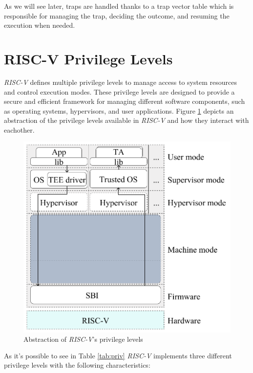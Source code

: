 As we will see later, traps are handled thanks to a trap vector table which is responsible
for managing the trap, deciding the outcome, and resuming the execution when needed.

\section{RISC-V Privilege Levels}
\label{sec:riscv_privileges}

\textit{RISC-V} defines multiple privilege levels to manage access to system resources
and control execution modes. These privilege levels are designed to provide a
secure and efficient framework for managing different software components, such as
operating systems, hypervisors, and user applications. Figure \ref{fig:priv}
depicts an abstraction of the privilege levels available in \textit{RISC-V} and how
they interact with eachother.

\begin{figure}[htbp]
  \centering
  \includegraphics[width=.5\linewidth]{images/privileges.png}
  \caption{Abstraction of \textit{RISC-V}'s privilege levels}
  \label{fig:priv}
\end{figure}

As it's possible to see in Table \ref{tab:priv} \textit{RISC-V} implements three
different privilege levels with the following characteristics:

